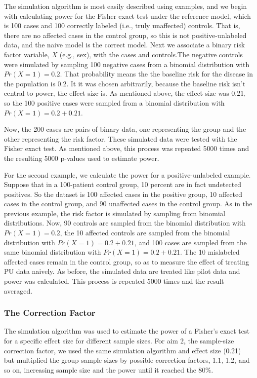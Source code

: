 \documentclass[
]{article}
\begin{document}
The simulation algorithm is most easily described using examples, and we
begin with calculating power for the Fisher exact test under the
reference model, which is 100 cases and 100 correctly labeled (i.e.,
truly unaffected) controls. That is, there are no affected cases in the
control group, so this is not positive-unlabeled data, and the naive
model is the correct model. Next we associate a binary risk factor
variable, \(X\) (e.g., sex), with the cases and controls.The negative
controls were simulated by sampling 100 negative cases from a binomial
distribution with \(Pr(X=1) = 0.2\). That probability means the the
baseline risk for the disease in the population is 0.2. It it was chosen
arbitrarily, because the baseline risk isn't central to power, the
effect size is. As mentioned above, the effect size was 0.21, so the 100
positive cases were sampled from a binomial distribution with
\(Pr(X=1) = 0.2 + 0.21\).

Now, the 200 cases are pairs of binary data, one representing the group
and the other representing the risk factor. These simulated data were
tested with the Fisher exact test. As mentioned above, this process was
repeated 5000 times and the resulting 5000 p-values used to estimate
power.

For the second example, we calculate the power for a positive-unlabeled
example. Suppose that in a 100-patient control group, 10 percent are in
fact undetected positives. So the dataset is 100 affected cases in the
positive group, 10 affected cases in the control group, and 90
unaffected cases in the control group. As in the previous example, the
risk factor is simulated by sampling from binomial distributions. Now,
90 controls are sampled from the binomial distribution with
\(Pr(X=1) = 0.2\), the 10 affected controls are sampled from the
binomial distribution with \(Pr(X=1) = 0.2+ 0.21\), and 100 cases are
sampled from the same binomial distribution with
\(Pr(X=1) = 0.2 + 0.21\). The 10 mislabeled affected cases remain in the
control group, so as to measure the effect of treating PU data naively.
As before, the simulated data are treated like pilot data and power was
calculated. This process is repeated 5000 times and the result averaged.

\hypertarget{the-correction-factor}{%
\subsubsection{The Correction Factor}\label{the-correction-factor}}

The simulation algorithm was used to estimate the power of a Fisher's
exact test for a specific effect size for different sample sizes. For
aim 2, the sample-size correction factor, we used the same simulation
algorithm and effect size (0.21) but multiplied the group sample sizes
by possible correction factors, 1.1, 1.2, and so on, increasing sample
size and the power until it reached the 80\%.
\end{document}
